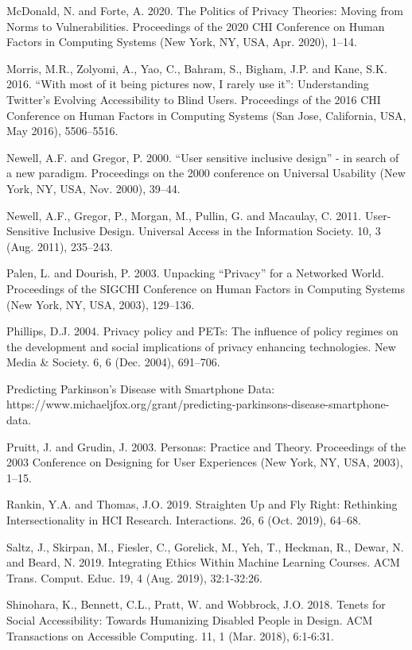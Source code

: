 \documentclass[11pt,dvipdfm]{article}
\begin{document}
\begin{thebibliography}{10}
\begin{small}
McDonald, N. and Forte, A. 2020. The Politics of Privacy Theories: Moving from Norms to Vulnerabilities. Proceedings of the 2020 CHI Conference on Human Factors in Computing Systems (New York, NY, USA, Apr. 2020), 1–14.

Morris, M.R., Zolyomi, A., Yao, C., Bahram, S., Bigham, J.P. and Kane, S.K. 2016. “With most of it being pictures now, I rarely use it”: Understanding Twitter’s Evolving Accessibility to Blind Users. Proceedings of the 2016 CHI Conference on Human Factors in Computing Systems (San Jose, California, USA, May 2016), 5506–5516.

Newell, A.F. and Gregor, P. 2000. “User sensitive inclusive design” - in search of a new paradigm. Proceedings on the 2000 conference on Universal Usability (New York, NY, USA, Nov. 2000), 39–44.

Newell, A.F., Gregor, P., Morgan, M., Pullin, G. and Macaulay, C. 2011. User-Sensitive Inclusive Design. Universal Access in the Information Society. 10, 3 (Aug. 2011), 235–243. 

Palen, L. and Dourish, P. 2003. Unpacking “Privacy” for a Networked World. Proceedings of the SIGCHI Conference on Human Factors in Computing Systems (New York, NY, USA, 2003), 129–136.

Phillips, D.J. 2004. Privacy policy and PETs: The influence of policy regimes on the development and social implications of privacy enhancing technologies. New Media \& Society. 6, 6 (Dec. 2004), 691–706. 

Predicting Parkinson’s Disease with Smartphone Data: https://www.michaeljfox.org/grant/predicting-parkinsons-disease-smartphone-data. 

Pruitt, J. and Grudin, J. 2003. Personas: Practice and Theory. Proceedings of the 2003 Conference on Designing for User Experiences (New York, NY, USA, 2003), 1–15.

Rankin, Y.A. and Thomas, J.O. 2019. Straighten Up and Fly Right: Rethinking Intersectionality in HCI Research. Interactions. 26, 6 (Oct. 2019), 64–68.

Saltz, J., Skirpan, M., Fiesler, C., Gorelick, M., Yeh, T., Heckman, R., Dewar, N. and Beard, N. 2019. Integrating Ethics Within Machine Learning Courses. ACM Trans. Comput. Educ. 19, 4 (Aug. 2019), 32:1-32:26. 

Shinohara, K., Bennett, C.L., Pratt, W. and Wobbrock, J.O. 2018. Tenets for Social Accessibility: Towards Humanizing Disabled People in Design. ACM Transactions on Accessible Computing. 11, 1 (Mar. 2018), 6:1-6:31. 


\end{small}
\end{thebibliography}
\end{document}
